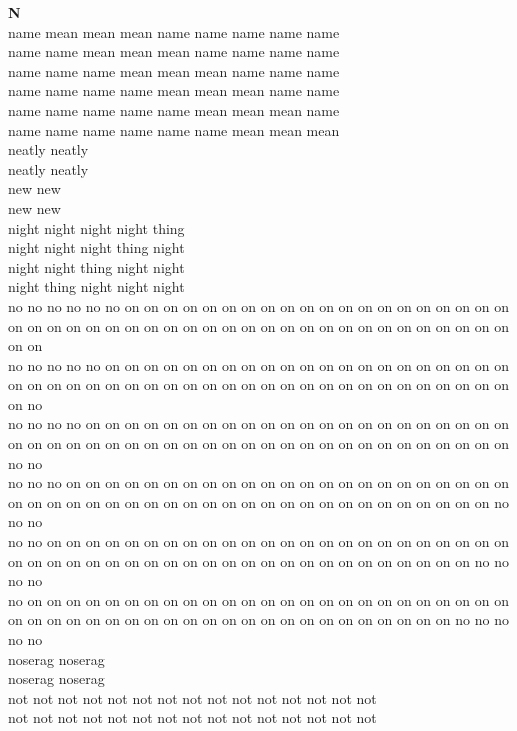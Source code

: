 \vspace{14pt}
\noindent\textbf{\Large N}\\[+12pt]
name mean mean mean name name name name name\\
name name mean mean mean name name name name\\
name name name mean mean mean name name name\\
name name name name mean mean mean name name\\
name name name name name mean mean mean name\\
name name name name name name mean mean mean\\
neatly neatly\\
neatly neatly\\
new new\\
new new\\
night night night night thing\\
night night night thing night\\
night night thing night night\\
night thing night night night\\
no no no no no no on on on on on on on on on on on on on on on on on on on on on on on on on on on on on on on on on on on on on on on on on on on on on on on on\\
no no no no no on on on on on on on on on on on on on on on on on on on on on on on on on on on on on on on on on on on on on on on on on on on on on on on on no\\
no no no no on on on on on on on on on on on on on on on on on on on on on on on on on on on on on on on on on on on on on on on on on on on on on on on on no no\\
no no no on on on on on on on on on on on on on on on on on on on on on on on on on on on on on on on on on on on on on on on on on on on on on on on on no no no\\
no no on on on on on on on on on on on on on on on on on on on on on on on on on on on on on on on on on on on on on on on on on on on on on on on on no no no no\\
no on on on on on on on on on on on on on on on on on on on on on on on on on on on on on on on on on on on on on on on on on on on on on on on on no no no no no\\
noserag noserag\\
noserag noserag\\
not not not not not not not not not not not not not not not\\
not not not not not not not not not not not not not not not\\
